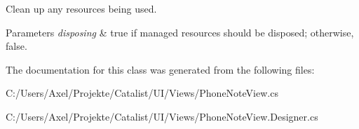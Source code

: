 Clean up any resources being used. 


\begin{DoxyParams}{Parameters}
{\em disposing} & true if managed resources should be disposed; otherwise, false.\\
\hline
\end{DoxyParams}


The documentation for this class was generated from the following files\+:\begin{DoxyCompactItemize}
\item 
C\+:/\+Users/\+Axel/\+Projekte/\+Catalist/\+U\+I/\+Views/Phone\+Note\+View.\+cs\item 
C\+:/\+Users/\+Axel/\+Projekte/\+Catalist/\+U\+I/\+Views/Phone\+Note\+View.\+Designer.\+cs\end{DoxyCompactItemize}
